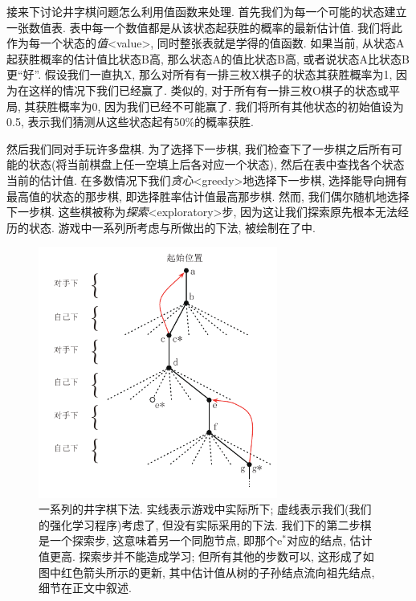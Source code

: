 接来下讨论井字棋问题怎么利用值函数来处理. 首先我们为每一个可能的状态建立一张数值表. 表中每一个数值都是从该状态起获胜的概率的最新估计值. 我们将此作为每一个状态的\emph{值}<value>, 同时整张表就是学得的值函数. 如果当前, 从状态\textsf{A}起获胜概率的估计值比状态\textsf{B}高, 那么状态\textsf{A}的值比状态\textsf{B}高, 或者说状态\textsf{A}比状态\textsf{B}更``好''. 假设我们一直执\textsf{X}, 那么对所有有一排三枚\textsf{X}棋子的状态其获胜概率为1, 因为在这样的情况下我们已经赢了. 类似的, 对于所有有一排三枚\textsf{O}棋子的状态或平局, 其获胜概率为0, 因为我们已经不可能赢了. 我们将所有其他状态的初始值设为0.5, 表示我们猜测从这些状态起有50\%的概率获胜.

然后我们同对手玩许多盘棋. 为了选择下一步棋, 我们检查下了一步棋之后所有可能的状态(将当前棋盘上任一空填上后各对应一个状态), 然后在表中查找各个状态当前的估计值. 在多数情况下我们\emph{贪心}<greedy>地选择下一步棋, 选择能导向拥有最高值的状态的那步棋, 即选择胜率估计值最高那步棋. 然而, 我们偶尔随机地选择下一步棋. 这些棋被称为\emph{探索}<exploratory>步, 因为这让我们探索原先根本无法经历的状态. 游戏中一系列所考虑与所做出的下法, 被绘制在了中.

\begin{figure}[ht]
\begin{center}
\includegraphics[width=0.7\textwidth]{c1/img/figure1-1.pdf}
\end{center}
\caption{一系列的井字棋下法. 实线表示游戏中实际所下; 虚线表示我们(我们的强化学习程序)考虑了, 但没有实际采用的下法. 我们下的第二步棋是一个探索步, 这意味着另一个同胞节点, 即那个$\mathrm e^*$对应的结点, 估计值更高. 探索步并不能造成学习; 但所有其他的步数可以, 这形成了如图中红色箭头所示的更新, 其中估计值从树的子孙结点流向祖先结点, 细节在正文中叙述.}\label{fig:1.1}
\end{figure}

